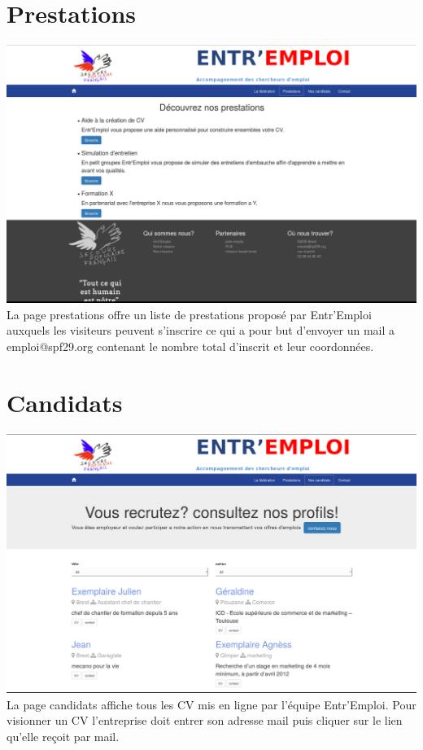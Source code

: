 \documentclass[a4paper, 12pt]{report}
\begin{document}
\section{Prestations}
\includegraphics[width=16cm]{prestations.png}
\\
La page prestations offre un liste de prestations proposé par Entr'Emploi auxquels les visiteurs peuvent s'inscrire ce qui a pour but d'envoyer un mail a emploi@spf29.org contenant le nombre total d'inscrit et leur coordonnées. 
\section{Candidats}
\includegraphics[width=16cm]{candidats.png}
\\
La page candidats affiche tous les CV mis en ligne par l'équipe Entr'Emploi. Pour visionner un CV l'entreprise doit entrer son adresse mail puis cliquer sur le lien qu'elle reçoit par mail.
\end{document}
